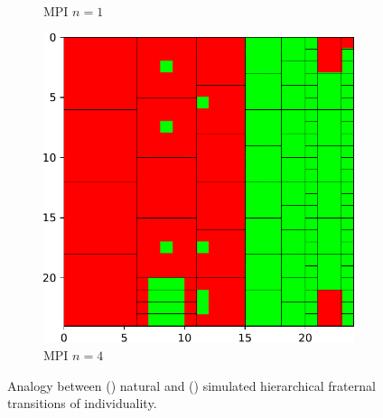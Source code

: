 \begin{figure}
\begin{subfigure}[b]{0.33\textwidth}
\caption{
MPI $n=1$
}
\label{fig:mpi_n1_correctness}
\end{subfigure}%
\begin{subfigure}[b]{0.33\textwidth}
  \includegraphics[width=\textwidth]{img/MPI-n4-correctness}
\caption{
MPI $n=4$
}
\label{fig:mpi_n4_correctness}
\end{subfigure}
\caption{
Analogy between () natural and () simulated hierarchical fraternal transitions of individuality.
}
\end{figure}

